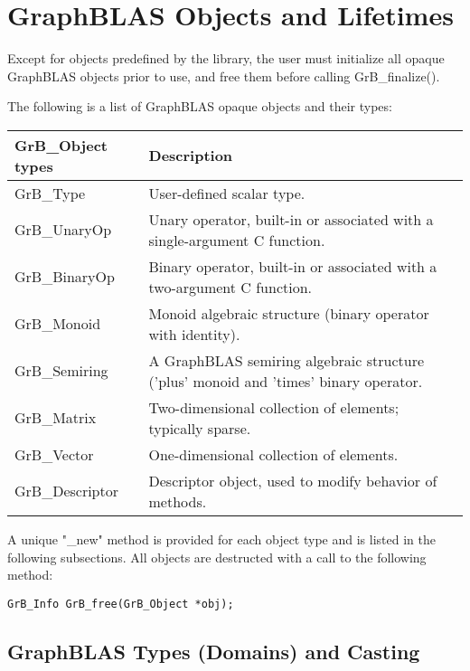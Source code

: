 \documentclass[11pt]{article}
\begin{document}
\section{GraphBLAS Objects and Lifetimes}

Except for objects predefined by the library, the user must initialize all opaque 
GraphBLAS objects prior to use, and free them before calling {\sf GrB\_finalize()}.

The following is a list of GraphBLAS opaque objects and their types:

\begin{tabular}{l|l} \hline 
{\sf GrB\_Object types} & Description \\
\hline
{\sf GrB\_Type}           & User-defined scalar type.     \\
{\sf GrB\_UnaryOp}        & Unary operator, built-in or associated with a single-argument C function.     \\
{\sf GrB\_BinaryOp}       & Binary operator, built-in or associated with a two-argument C function.     \\
{\sf GrB\_Monoid}         & Monoid algebraic structure (binary operator with identity).     \\
{\sf GrB\_Semiring}       & A GraphBLAS semiring algebraic structure ('plus' monoid and 'times' binary operator.     \\
{\sf GrB\_Matrix}         & Two-dimensional collection of elements; typically sparse.    \\
{\sf GrB\_Vector}         & One-dimensional collection of elements.     \\
{\sf GrB\_Descriptor}     & Descriptor object, used to modify behavior of methods.     \\ \hline
\end{tabular}

A unique "{\sf \_new}" method is provided for each object type and is listed in the following subsections.  All objects are destructed with
a call to the following method:

\begin{verbatim}
GrB_Info GrB_free(GrB_Object *obj);
\end{verbatim}
         
\subsection{GraphBLAS Types (Domains) and Casting}
              
\end{document}
